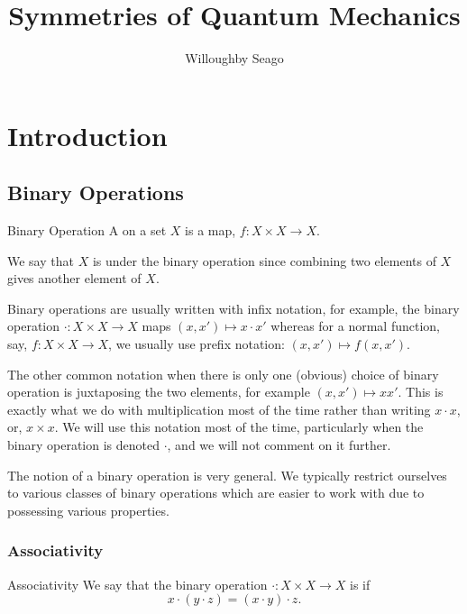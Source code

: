 \documentclass[fleqn]{NotesClass}
\title{Symmetries of Quantum Mechanics}
\author{Willoughby Seago}
\date{}
\begin{document}
    \frontmatter
    \titlepage
    \tableofcontents
    \mainmatter
    \chapter{Introduction}
    \section{Binary Operations}
    
    \begin{dfn}{Binary Operation}{}
        A  on a set \(X\) is a map, \(f\colon X \times X \to X\).
        
        \begin{rmk}
            We say that \(X\) is  under the binary operation since combining two elements of \(X\) gives another element of \(X\).
        \end{rmk}
    \end{dfn}
    
    \begin{ntn}{}{}
        Binary operations are usually written with infix notation, for example, the binary operation \(\cdot \colon X \times X \to X\) maps \((x, x') \mapsto x \cdot x'\) whereas for a normal function, say, \(f\colon X \times X \to X\), we usually use prefix notation: \((x, x') \mapsto f(x, x')\).
        
        The other common notation when there is only one (obvious) choice of binary operation is juxtaposing the two elements, for example \((x, x') \mapsto xx'\).
        This is exactly what we do with multiplication most of the time rather than writing \(x \cdot x\), or, \(x \times x\).
        We will use this notation most of the time, particularly when the binary operation is denoted \(\cdot\), and we will not comment on it further.
    \end{ntn}
    
    The notion of a binary operation is very general.
    We typically restrict ourselves to various classes of binary operations which are easier to work with due to possessing various properties.
    
    \subsection{Associativity}
    \begin{dfn}{Associativity}{}
        We say that the binary operation \(\cdot\colon X \times X \to X\) is  if
        \begin{equation}
            x \cdot (y \cdot z) = (x \cdot y) \cdot z.
        \end{equation}
    \end{dfn}
    
\end{document}
